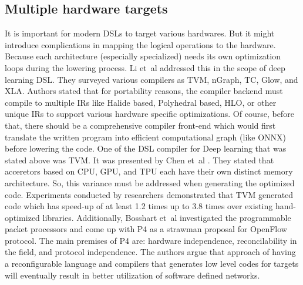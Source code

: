 \documentclass[conference]{IEEEtran}
\begin{document}
\subsection{Multiple hardware targets}
It is important for modern DSLs to target various hardwares. But it might introduce complications in mapping the logical operations to the hardware. Because each architecture (especially specialized) needs its own optimization loops during the lowering process. Li et~al \cite{ref5} addressed this in the scope of deep learning DSL. They surveyed various compilers as TVM, nGraph, TC, Glow, and XLA. Authors stated that for portability reasons, the compiler backend must compile to multiple IRs like Halide based, Polyhedral based, HLO, or other unique IRs to support various hardware specific optimizations. Of course, before that, there should be a comprehensive compiler front-end which would first translate the written program into efficient computational graph (like ONNX) before lowering the code. One of the DSL compiler for Deep learning that was stated above was TVM. It was presented by Chen et~al \cite{ref6}. They stated that acceretors based on CPU, GPU, and TPU each have their own distinct memory architecture. So, this variance must be addressed when generating the optimized code. Experiments conducted by researchers demonstrated that TVM generated code which has speed-up of at least 1.2 times up to 3.8 times over existing hand-optimized libraries. Additionally, Bosshart et~al \cite{ref14} investigated the programmable packet processors and come up with P4 as a strawman proposal for OpenFlow protocol. The main premises of P4 are: hardware independence, reconcilability in the field, and protocol independence. The authors argue that approach of having a reconfigurable language and compilers that generates low level codes for targets will eventually result in better utilization of software defined networks.   
\end{document}

